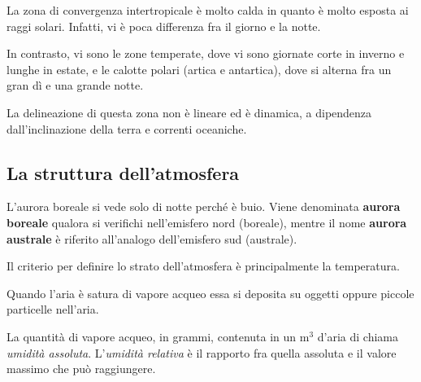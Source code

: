 \documentclass[a4paper]{article}
\begin{document}
La zona di convergenza intertropicale è molto calda in quanto è molto esposta ai raggi solari.
Infatti, vi è poca differenza fra il giorno e la notte.

In contrasto, vi sono le zone temperate, dove vi sono giornate corte in inverno e lunghe
in estate, e le calotte polari (artica e antartica), dove si alterna fra un gran dì e una grande notte.

La delineazione di questa zona non è lineare ed è dinamica, a dipendenza dall'inclinazione della terra
e correnti oceaniche.



\pagebreak

\subsection{La struttura dell'atmosfera}


L'aurora boreale si vede solo di notte perché è buio.
Viene denominata \textbf{aurora boreale} qualora si verifichi nell'emisfero nord (boreale),
mentre il nome \textbf{aurora australe} è riferito all'analogo dell'emisfero sud (australe). 

Il criterio per definire lo strato dell'atmosfera è principalmente la temperatura.


Quando l'aria è satura di vapore acqueo essa si deposita su oggetti oppure piccole particelle nell'aria.

La quantità di vapore acqueo, in grammi, contenuta in un m\({}^3\) d'aria di chiama \textit{umidità assoluta}.
L'\textit{umidità relativa} è il rapporto fra quella assoluta e il valore massimo che può raggiungere.
\end{document}
